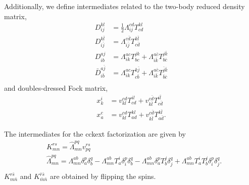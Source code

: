 \documentclass[a4paper,12pt,oneside]{book}
\newcommand{\half}{\frac{1}{2}}
\newcommand{\spa}[1]{{#1}}
\newcommand{\spb}[1]{\bar{#1}}
\begin{document}
Additionally, we define intermediates related to the two-body reduced density matrix,
\begin{equation}
\begin{aligned}
D_{\spa{i}\spa{j}}^{\spa{k}\spa{l}} &= \half Λ_{\spa{i}\spa{j}}^{\spa{c}\spa{d}} T^{\spa{k}\spa{l}}_{\spa{c}\spa{d}}\\
D_{\spa{i}\spb{j}}^{\spa{k}\spb{l}} &= Λ_{\spa{i}\spb{j}}^{\spa{c}\spb{d}} T^{\spa{k}\spb{l}}_{\spa{c}\spb{d}}\\
D_{\spa{i}\spa{b}}^{\spa{a}\spa{j}} &= Λ_{\spa{i}\spa{k}}^{\spa{a}\spa{c}} T^{\spa{j}\spa{k}}_{\spa{b}\spa{c}}
+Λ_{\spa{i}\spb{k}}^{\spa{a}\spb{c}} T^{\spa{j}\spb{k}}_{\spa{b}\spb{c}}\\
\bar D_{\spa{i}\spb{b}}^{\spa{a}\spb{j}} &= Λ_{\spa{i}\spa{k}}^{\spa{a}\spa{c}} T^{\spa{k}\spb{j}}_{\spa{c}\spb{b}}
+Λ_{\spa{i}\spb{k}}^{\spa{a}\spb{c}} T^{\spb{j}\spb{k}}_{\spb{b}\spb{c}}\\
\end{aligned}
\end{equation}
and doubles-dressed Fock matrix,
\begin{equation}
\begin{aligned}
x_{\spa{k}}^{\spa{i}} &= v_{\spa{k}\spa{l}}^{\spa{c}\spa{d}} T^{\spa{i}\spa{l}}_{\spa{c}\spa{d}}
+v_{\spa{k}\spb{l}}^{\spa{c}\spb{d}} T^{\spa{i}\spb{l}}_{\spa{c}\spb{d}}\\
x_{\spa{a}}^{\spa{c}} &= v_{\spa{k}\spa{l}}^{\spa{c}\spa{d}} T^{\spa{k}\spa{l}}_{\spa{a}\spa{d}}
+v_{\spa{k}\spb{l}}^{\spa{c}\spb{d}} T^{\spa{k}\spb{l}}_{\spa{a}\spb{d}}.
\end{aligned}
\end{equation}

The intermediates for the \textsf{cckext} factorization are given by
\begin{equation}
\begin{aligned}
&K_{\spa{m}\spa{n}}^{\spa{r}\spa{s}} = \hat \Lambda_{\spa{m}\spa{n}}^{\spa{p}\spa{q}} v_{\spa{p}\spa{q}}^{\spa{r}\spa{s}} \\
&\hat \Lambda_{\spa{m}\spa{n}}^{\spa{p}\spa{q}} = Λ_{\spa{m}\spa{n}}^{\spa{a}\spa{b}}\delta_{\spa{a}}^{\spa{p}}\delta_{\spa{b}}^{\spa{q}} 
- Λ_{\spa{m}\spa{n}}^{\spa{a}\spa{b}} T^\spa{i}_\spa{a} \delta_\spa{i}^\spa{p} \delta_\spa{b}^\spa{q}
- Λ_{\spa{m}\spa{n}}^{\spa{a}\spa{b}} \delta_\spa{a}^\spa{p} T^\spa{j}_\spa{b} \delta_\spa{j}^\spa{q}
+ Λ_{\spa{m}\spa{n}}^{\spa{a}\spa{b}} T^\spa{i}_\spa{a} T^\spa{j}_\spa{b} \delta_\spa{i}^\spa{p} \delta_\spa{j}^\spa{q}.\\
\end{aligned}
\end{equation}
$K_{\spa{m}\spb{n}}^{\spa{r}\spb{s}}$ and $K_{\spb{m}\spb{n}}^{\spb{r}\spb{s}}$ are obtained by flipping the spins.
\end{document}
